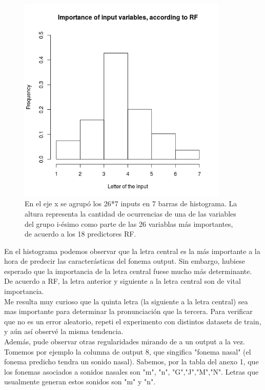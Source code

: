 \documentclass[paper=a4, fontsize=11pt]{scrartcl} %
\numberwithin{equation}{section} %
\numberwithin{figure}{section} %
\numberwithin{table}{section} %
\begin{document}
\begin{figure}[h!]
\centering
\includegraphics[width=100mm]{variable_importance.jpg}
\caption{En el eje x se agrupó los 26*7 inputs en 7 barras de histograma. La altura representa la cantidad de ocurrencias de una de las variables del grupo i-ésimo como parte de las 26 variablas más importantes, de acuerdo a los 18 predictores RF.}
\label{fig:results}

\end{figure}

En el histograma podemos observar que la letra central es la más importante a la hora de predecir las caracterásticas del fonema output. Sin embargo, hubiese esperado que la importancia de la letra central fuese mucho más determinante. De acuerdo a RF, la letra anterior y siguiente a la letra central son de vital importancia. \\

Me resulta muy curioso que la quinta letra (la siguiente a la letra central) sea mas importante para determinar la pronunciación que la tercera. Para verificar que no es un error aleatorio, repeti el experimento con distintos datasets de train, y aún así observé la misma tendencia. \\

Además, pude observar otras regularidades mirando de a un output a la vez. Tomemos por ejemplo la columna de output 8, que singifica "fonema nasal" (el fonema predicho tendra un sonido nasal). Sabemos, por la tabla del anexo 1, que los fonemas asociados a sonidos nasales son "m", "n", "G","J","M","N". Letras que usualmente generan estos sonidos son "m" y "n". \\
\end{document}
